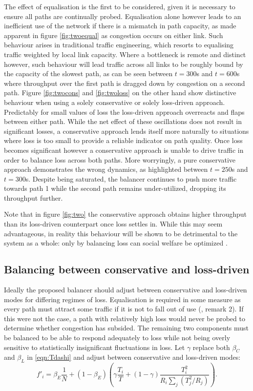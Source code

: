 The effect of equalisation is the first to be considered, given it is necessary to ensure all paths are continually probed. 
Equalisation alone however leads to an inefficient use of the network if there is a mismatch in path capacity, as made apparent in figure \ref{fig:twoequal} as congestion occurs on either link. 
Such behaviour arises in traditional traffic engineering, which resorts to equalising traffic weighted by local link capacity.  
Where a bottleneck is remote and distinct however, such behaviour will lead traffic across all links to be roughly bound by the capacity of the slowest path, as can be seen between $t=300$s and $t=600$s where throughput over the first path is dragged down by congestion on a second path.  
Figure \ref{fig:twocons} and \ref{fig:twoloss} on the other hand show distinctive behaviour when using a solely conservative or solely loss-driven approach. 
Predictably for small values of loss the loss-driven approach overreacts and flaps between either path. 
While the net effect of these oscillations does not result in significant losses, a conservative approach lends itself more naturally to situations where loss is too small to provide a reliable indicator on path quality. 
Once loss becomes significant however a conservative approach is unable to drive traffic in order to balance loss across both paths. 
More worryingly, a pure conservative approach demonstrates the wrong dynamics, as highlighted between $t=250$s and $t=300$s. 
Despite being saturated, the balancer continues to push more traffic towards path 1 while the second path remains under-utilized, dropping its throughput further.

Note that in figure \ref{fig:two} the conservative approach obtains higher throughput than its loss-driven counterpart once loss settles in. 
While this may seem advantageous, in reality this behaviour will be shown to be detrimental to the system as a whole: only by balancing loss can social welfare be optimized \cite{Kelly:2005p140}.

\subsection{Balancing between conservative and loss-driven}

Ideally the proposed balancer should adjust between conservative and loss-driven modes for differing regimes of loss.
Equalisation is required in some measure as every path must attract some traffic if it is not to fall out of use (\cite{Kelly:2005p140}, remark 2). 
If this were not the case, a path with relatively high loss would never be probed to determine whether congestion has subsided.
The remaining two components must be balanced to be able to respond adequately to loss while not being overly sensitive to statistically insignificant fluctuations in loss. 
Let $\gamma$ replace both $\beta_C$ and $\beta_L$ in \eqref{eqn:Tdashi} and adjust between conservative and loss-driven modes:
\begin{equation}
f'_i = \beta_E \frac{1}{N} + \left( 1-\beta_E \right) \left(
\gamma \frac{T_i}{T} + \left(1-\gamma\right) \frac{T_i^2}{R_i \sum_j
(T_j^2/R_j)} \right).
\label{eqn:gamma}
\end{equation}

